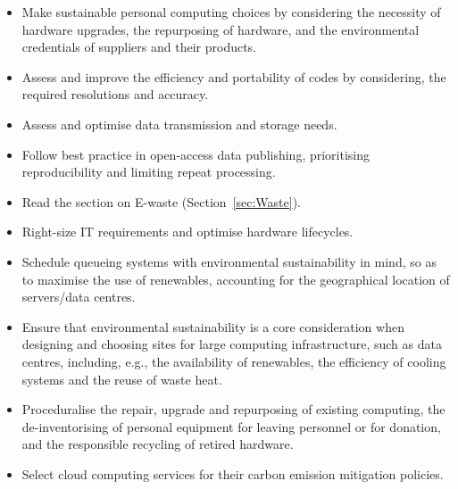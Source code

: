\documentclass[../SustainableHEP.tex]{subfiles}
\begin{document}
\newpage
\begin{reco2}{\currentname}
{
\begin{itemize}[leftmargin=6 mm]
\setlength{\itemsep}{\recskip}
\item Make sustainable personal computing choices by considering the necessity of hardware upgrades, the repurposing of hardware, and the environmental credentials of suppliers and their products. 

\item Assess and improve the efficiency and portability of codes by considering, \eg the required resolutions and accuracy.

\item Assess and optimise data transmission and storage needs.

\item Follow best practice in open-access data publishing, prioritising reproducibility and limiting repeat processing.

\item Read the section on E-waste (Section~\ref{sec:Waste}).

\end{itemize}
}
{
\begin{itemize}[leftmargin=6 mm]
\setlength{\itemsep}{\recskip}
\item Right-size IT requirements and optimise hardware lifecycles.
\item Schedule queueing systems with environmental sustainability in mind, so as to maximise the use of renewables, accounting for the geographical location of servers/data centres.
\end{itemize}
}
{
\begin{itemize}[leftmargin=6 mm]
\setlength{\itemsep}{\recskip}
\item Ensure that environmental sustainability is a core consideration when designing and choosing sites for large computing infrastructure, such as data centres, including, e.g., the availability of renewables, the efficiency of cooling systems and the reuse of waste heat.

\item Proceduralise the repair, upgrade and repurposing of existing computing, the de-inventorising of personal equipment for leaving personnel or for donation, and the responsible recycling of retired hardware.

\item Select cloud computing services for their carbon emission mitigation policies.

\end{itemize}
}
\end{reco2}
\end{document}

